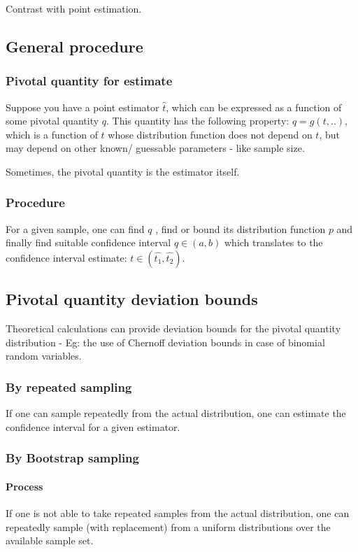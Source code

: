 \documentclass[oneside, article]{memoir}
\begin{document}
Contrast with point estimation.

\subsection{General procedure}
\subsubsection{Pivotal quantity for estimate}
Suppose you have a point estimator $\hat{t}$, which can be expressed as a function of some pivotal quantity $q$. This quantity has the following property: $q = g(t, .. )$, which is a function of $t$ whose distribution function does not depend on $t$, but may depend on other known/ guessable parameters - like sample size.

Sometimes, the pivotal quantity is the estimator itself.

\subsubsection{Procedure}
For a given sample, one can find $q$ , find or bound its distribution function $p$ and finally find suitable confidence interval $q \in (a, b)$ which translates to the confidence interval estimate: $t \in (\hat{t_{1}}, \hat{t_{2}})$.

\subsection{Pivotal quantity deviation bounds}
Theoretical calculations can provide deviation bounds for the pivotal quantity distribution - Eg: the use of Chernoff deviation bounds in case of binomial random variables.

\subsubsection{By repeated sampling}
If one can sample repeatedly from the actual distribution, one can estimate the confidence interval for a given estimator.

\subsubsection{By Bootstrap sampling}
\paragraph{Process}
If one is not able to take repeated samples from the actual distribution, one can repeatedly sample (with replacement) from a uniform distributions over the available sample set.
\end{document}
